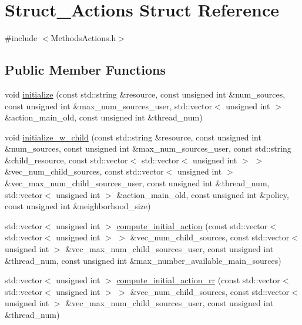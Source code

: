 \hypertarget{structStruct__Actions}{\section{Struct\-\_\-\-Actions Struct Reference}
\label{structStruct__Actions}
}


{\ttfamily \#include $<$Methods\-Actions.\-h$>$}

\subsection*{Public Member Functions}
\begin{DoxyCompactItemize}
\item 
void \hyperlink{structStruct__Actions_ad28379afcba301fca72e1e6939fa4c4f}{initialize} (const std\-::string \&resource, const unsigned int \&num\-\_\-sources, const unsigned int \&max\-\_\-num\-\_\-sources\-\_\-user, std\-::vector$<$ unsigned int $>$ \&action\-\_\-main\-\_\-old, const unsigned int \&thread\-\_\-num)
\item 
void \hyperlink{structStruct__Actions_a65aec6da3f4aa08047e285566fe45487}{initialize\-\_\-w\-\_\-child} (const std\-::string \&resource, const unsigned int \&num\-\_\-sources, const unsigned int \&max\-\_\-num\-\_\-sources\-\_\-user, const std\-::string \&child\-\_\-resource, const std\-::vector$<$ std\-::vector$<$ unsigned int $>$ $>$ \&vec\-\_\-num\-\_\-child\-\_\-sources, const std\-::vector$<$ unsigned int $>$ \&vec\-\_\-max\-\_\-num\-\_\-child\-\_\-sources\-\_\-user, const unsigned int \&thread\-\_\-num, std\-::vector$<$ unsigned int $>$ \&action\-\_\-main\-\_\-old, const unsigned int \&policy, const unsigned int \&neighborhood\-\_\-size)
\item 
std\-::vector$<$ unsigned int $>$ \hyperlink{structStruct__Actions_a2d1d697fe7778e807179b7bef8c809db}{compute\-\_\-initial\-\_\-action} (const std\-::vector$<$ std\-::vector$<$ unsigned int $>$ $>$ \&vec\-\_\-num\-\_\-child\-\_\-sources, const std\-::vector$<$ unsigned int $>$ \&vec\-\_\-max\-\_\-num\-\_\-child\-\_\-sources\-\_\-user, const unsigned int \&thread\-\_\-num, const unsigned int \&max\-\_\-number\-\_\-available\-\_\-main\-\_\-sources)
\item 
std\-::vector$<$ unsigned int $>$ \hyperlink{structStruct__Actions_a41346a1cddc836c0fcf0509debb5bcd6}{compute\-\_\-initial\-\_\-action\-\_\-rr} (const std\-::vector$<$ std\-::vector$<$ unsigned int $>$ $>$ \&vec\-\_\-num\-\_\-child\-\_\-sources, const std\-::vector$<$ unsigned int $>$ \&vec\-\_\-max\-\_\-num\-\_\-child\-\_\-sources\-\_\-user, const unsigned int \&thread\-\_\-num)
\end{DoxyCompactItemize}
